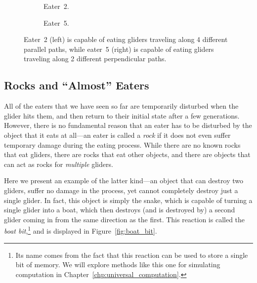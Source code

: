 \begin{figure}[!htb]
	\begin{subfigure}{.5\textwidth}
		\centering
		\caption{Eater~2.}
		\label{fig:eater_2}
	\end{subfigure}%
	\begin{subfigure}{.5\textwidth}
		\centering
		\caption{Eater~5.}
		\label{fig:eater_5}
	\end{subfigure}
	\caption{Eater~2 (left) is capable of eating gliders traveling along 4 different parallel paths, while eater~5 (right) is capable of eating gliders traveling along 2 different perpendicular paths.}\label{fig:eater_2_5}
\end{figure}


\subsection{Rocks and ``Almost'' Eaters}\label{sec:rocks_almost_eaters}

All of the eaters that we have seen so far are temporarily disturbed when the glider hits them, and then return to their initial state after a few generations. However, there is no fundamental reason that an eater has to be disturbed by the object that it eats at all---an eater is called a \emph{rock} if it does not even suffer temporary damage during the eating process. While there are no known rocks that eat gliders, there are rocks that eat other objects, and there are objects that can act as rocks for \emph{multiple} gliders.

Here we present an example of the latter kind---an object that can destroy two gliders, suffer no damage in the process, yet cannot completely destroy just a single glider. In fact, this object is simply the snake, which is capable of turning a single glider into a boat, which then destroys (and is destroyed by) a second glider coming in from the same direction as the first. This reaction is called the \emph{boat bit},\footnote{Its name comes from the fact that this reaction can be used to store a single bit of memory. We will explore methods like this one for simulating computation in Chapter~\ref{chp:universal_computation}.} and is displayed in Figure~\ref{fig:boat_bit}.


